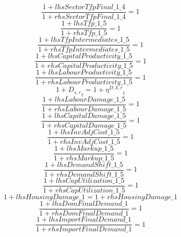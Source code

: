 \begin{dmath}
\frac{1+{lhsSectorTfpFinal\_1\_4}}{1+{rhsSectorTfpFinal\_1\_4}}=1
\end{dmath}
\begin{dmath}
\frac{1+{lhsTfp\_1\_5}}{1+{rhsTfp\_1\_5}}=1
\end{dmath}
\begin{dmath}
\frac{1+{lhsTfpIntermediates\_1\_5}}{1+{rhsTfpIntermediates\_1\_5}}=1
\end{dmath}
\begin{dmath}
\frac{1+{lhsCapitalProductivity\_1\_5}}{1+{rhsCapitalProductivity\_1\_5}}=1
\end{dmath}
\begin{dmath}
\frac{1+{lhsLabourProductivity\_1\_5}}{1+{rhsLabourProductivity\_1\_5}}=1
\end{dmath}
\begin{dmath}
1+{{D_{s,r}}}_{t}=1+{{\eta^{D,k,r}}}_{t}
\end{dmath}
\begin{dmath}
\frac{1+{lhsLabourDamage\_1\_5}}{1+{rhsLabourDamage\_1\_5}}=1
\end{dmath}
\begin{dmath}
\frac{1+{lhsCapitalDamage\_1\_5}}{1+{rhsCapitalDamage\_1\_5}}=1
\end{dmath}
\begin{dmath}
\frac{1+{lhsInvAdjCost\_1\_5}}{1+{rhsInvAdjCost\_1\_5}}=1
\end{dmath}
\begin{dmath}
\frac{1+{lhsMarkup\_1\_5}}{1+{rhsMarkup\_1\_5}}=1
\end{dmath}
\begin{dmath}
\frac{1+{lhsDemandShift\_1\_5}}{1+{rhsDemandShift\_1\_5}}=1
\end{dmath}
\begin{dmath}
\frac{1+{lhsCapUtilization\_1\_5}}{1+{rhsCapUtilization\_1\_5}}=1
\end{dmath}
\begin{dmath}
1+{lhsHousingDamage\_1}=1+{rhsHousingDamage\_1}
\end{dmath}
\begin{dmath}
\frac{1+{lhsDomFinalDemand\_1}}{1+{rhsDomFinalDemand\_1}}=1
\end{dmath}
\begin{dmath}
\frac{1+{lhsImportFinalDemand\_1}}{1+{rhsImportFinalDemand\_1}}=1
\end{dmath}
